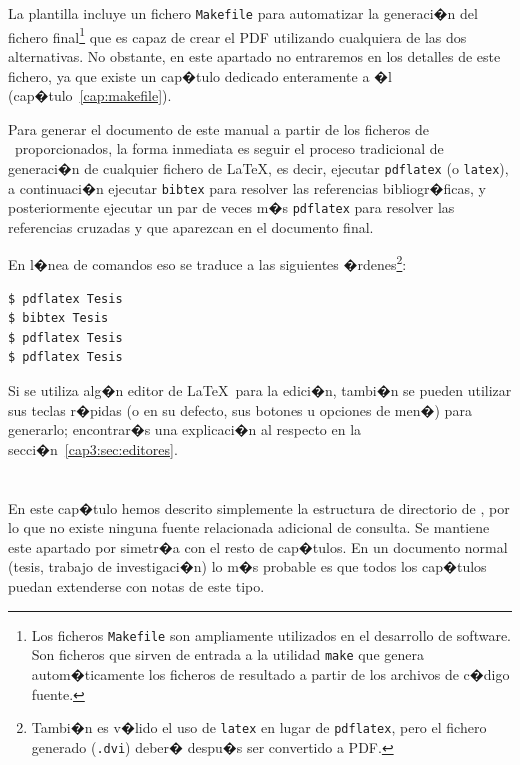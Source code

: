 La plantilla incluye un fichero \texttt{Makefile} para automatizar la
generaci�n del fichero final\footnote{Los ficheros \texttt{Makefile}
  son ampliamente utilizados en el desarrollo de software. Son
  ficheros que sirven de entrada a la utilidad \texttt{make} que
  genera autom�ticamente los ficheros de resultado a partir de los
  archivos de c�digo fuente.} que es capaz de crear el PDF utilizando
cualquiera de las dos alternativas. No obstante, en este apartado no
entraremos en los detalles de este fichero, ya que existe un cap�tulo
dedicado enteramente a �l (cap�tulo~\ref{cap:makefile}).

Para generar el documento de este manual a partir de los ficheros de
\texis\ proporcionados, la forma inmediata es seguir el proceso
tradicional de generaci�n de cualquier fichero de \LaTeX, es decir,
ejecutar \texttt{pdflatex} (o \texttt{latex}), a continuaci�n ejecutar
\texttt{bibtex} para resolver las referencias bibliogr�ficas, y
posteriormente ejecutar un par de veces m�s \texttt{pdflatex} para
resolver las referencias cruzadas y que aparezcan en el documento
final.

En l�nea de comandos eso se traduce a las siguientes
�rdenes\footnote{Tambi�n es v�lido el uso de \texttt{latex} en lugar
  de \texttt{pdflatex}, pero el fichero generado (\texttt{.dvi})
  deber� despu�s ser convertido a PDF.}:

\begin{verbatim}
$ pdflatex Tesis
$ bibtex Tesis
$ pdflatex Tesis
$ pdflatex Tesis
\end{verbatim}

Si se utiliza alg�n editor de \LaTeX\ para la edici�n, tambi�n se
pueden utilizar sus teclas r�pidas (o en su defecto, sus botones u
opciones de men�) para generarlo; encontrar�s una explicaci�n al
respecto en la secci�n~\ref{cap3:sec:editores}.

\section*{\NotasBibliograficas}
\TocNotasBibliograficas

En este cap�tulo hemos descrito simplemente la estructura de
directorio de \texis, por lo que no existe ninguna fuente
relacionada adicional de consulta. Se mantiene este apartado por
simetr�a con el resto de cap�tulos. En un documento normal (tesis,
trabajo de investigaci�n) lo m�s probable es que todos los cap�tulos
puedan extenderse con notas de este tipo.

